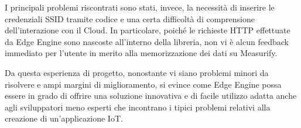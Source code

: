 I principali problemi riscontrati sono stati, invece, la necessità di inserire le credenziali SSID tramite codice e una certa difficoltà di comprensione dell'interazione con il Cloud. In particolare, poiché le richieste HTTP effettuate da Edge Engine sono nascoste all'interno della libreria, non vi è alcun feedback immediato per l'utente in merito alla memorizzazione dei dati su Measurify.

Da questa esperienza di progetto, nonostante vi siano problemi minori da risolvere e ampi margini di miglioramento, si evince come Edge Engine possa essere in grado di offrire una soluzione innovativa e di facile utilizzo adatta anche agli sviluppatori meno esperti che incontrano i tipici problemi relativi alla creazione di un'applicazione IoT.




